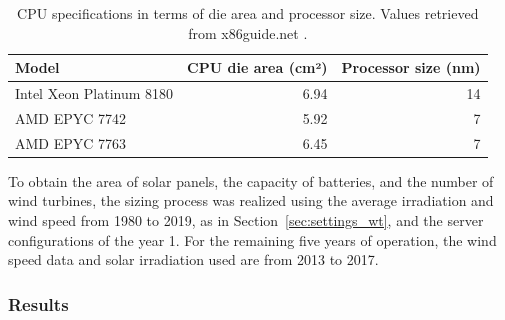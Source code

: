 \begin{table}[h]
  \small
  \caption{CPU specifications in terms of die area and processor size. Values retrieved from x86guide.net \cite{ref_amd_epyc_7742,ref_amd_epyc_7763,ref_xeon_platinum_8180}.} \centering
  \label{tab:cpu_specs} 
  \begin{tabular}{|l|r|r|}
   \hline

  \textbf{Model}  & \textbf{CPU die area (cm²)} & \textbf{Processor size (nm) } \\
    \hline
    Intel Xeon Platinum 8180 & 6.94 & 14\\
    \hline
    AMD EPYC 7742  & 5.92 & 7 \\
   \hline
    AMD EPYC 7763 & 6.45   & 7 \\
  \hline
\end{tabular}  
\end{table}

To obtain the area of solar panels, the capacity of batteries, and the number of wind turbines, the sizing process was realized using the average irradiation and wind speed from 1980 to 2019, as in Section~\ref{sec:settings_wt}, and the server configurations of the year 1. For the remaining five years of operation, the wind speed data and solar irradiation used are from 2013 to 2017.
\subsubsection{Results}

